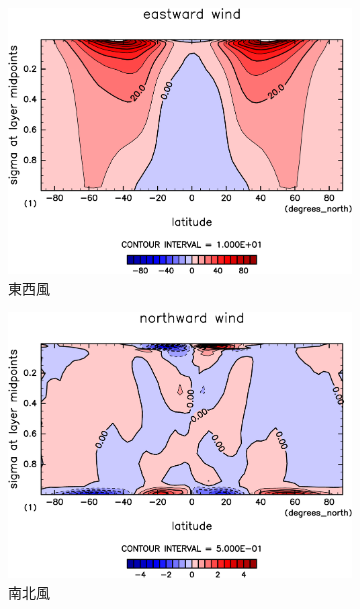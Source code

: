 \documentclass[body]{subfiles}
\begin{document}
\begin{figure}[t]
	\centering
	\begin{subfigure}{.4\textwidth}
		\centering
		\includegraphics[width=\textwidth]{S1500-nc/U,time=3650:4015-crop-rotate.pdf}
		\caption{東西風\hmu*{[m/s]}}\label{S1500nc東西風}
	\end{subfigure}
	\begin{subfigure}{.4\textwidth}
		\centering
		\includegraphics[width=\textwidth]{S1500-nc/V,time=3650:4015-crop-rotate.pdf}
		\caption{南北風\hmu*{[m/s]}}\label{S1500nc南北風}
	\end{subfigure}
	\begin{subfigure}{.4\textwidth}

\end{subfigure}
\end{figure}
\end{document}
